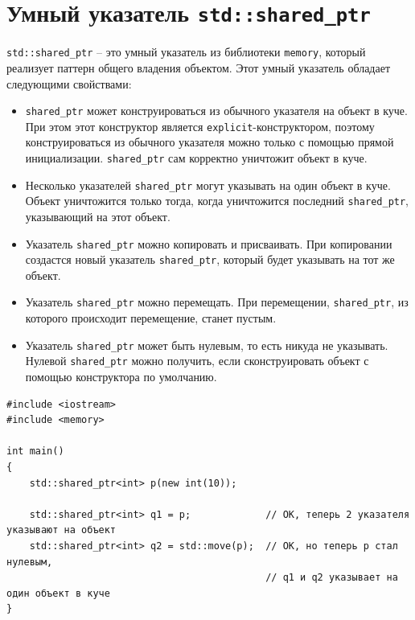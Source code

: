 \documentclass{article}
\begin{document}
\newpage
\section*{Умный указатель \texttt{std::shared\_ptr}}
\texttt{std::shared\_ptr} -- это умный указатель из библиотеки \texttt{memory}, который реализует паттерн общего владения объектом. Этот умный указатель обладает следующими свойствами:

\begin{itemize}
\item \texttt{shared\_ptr} может конструироваться из обычного указателя на объект в куче. При этом этот конструктор является \texttt{explicit}-конструктором, поэтому конструироваться из обычного указателя можно только с помощью прямой инициализации. \texttt{shared\_ptr} сам корректно уничтожит объект в куче.

\item Несколько указателей \texttt{shared\_ptr} могут указывать на один объект в куче. Объект уничтожится только тогда, когда уничтожится последний \texttt{shared\_ptr}, указывающий на этот объект.

\item Указатель \texttt{shared\_ptr} можно копировать и присваивать. При копировании создастся новый указатель \texttt{shared\_ptr}, который будет указывать на тот же объект.

\item Указатель \texttt{shared\_ptr} можно перемещать. При перемещении, \texttt{shared\_ptr}, из которого происходит перемещение, станет пустым.

\item Указатель \texttt{shared\_ptr} может быть нулевым, то есть никуда не указывать. Нулевой \texttt{shared\_ptr} можно получить, если сконструировать объект с помощью конструктора по умолчанию.
\end{itemize}

\begin{lstlisting}
#include <iostream>
#include <memory>

int main()
{
	std::shared_ptr<int> p(new int(10));
	
	std::shared_ptr<int> q1 = p;             // ОК, теперь 2 указателя указывают на объект
	std::shared_ptr<int> q2 = std::move(p);  // ОК, но теперь p стал нулевым, 
	                                         // q1 и q2 указывает на один объект в куче
}
\end{lstlisting}
\quad\\
\end{document}

